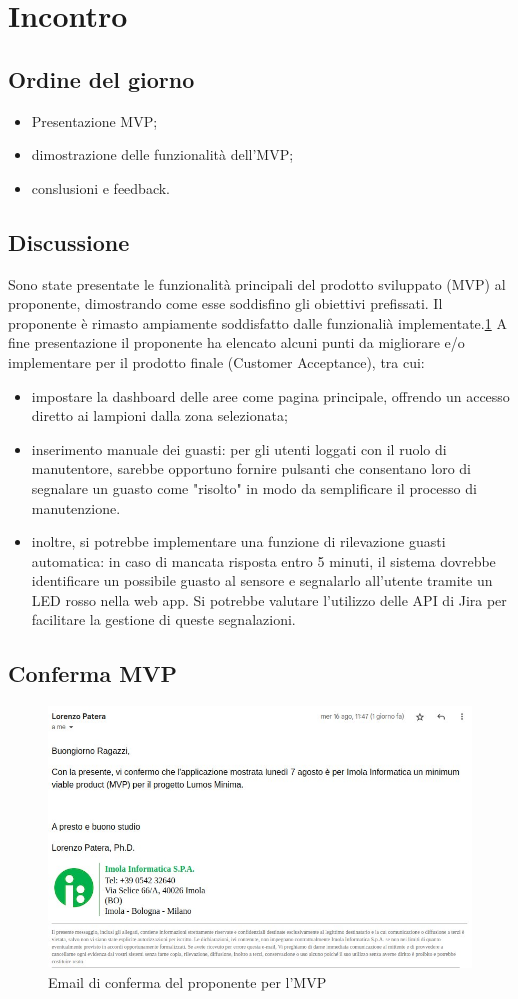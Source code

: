 \section{Incontro}

\subsection{Ordine del giorno}
\begin{itemize}
    \item Presentazione MVP;
    \item dimostrazione delle funzionalità dell'MVP;
    \item conslusioni e feedback.
\end{itemize}

\subsection{Discussione}
Sono state presentate le funzionalità principali del prodotto sviluppato (MVP) al proponente, dimostrando come esse soddisfino gli obiettivi prefissati. Il proponente è rimasto ampiamente soddisfatto dalle funzionalià implementate.\ref{fig:email-mvp}
A fine presentazione il proponente ha elencato alcuni punti da migliorare e/o implementare per il prodotto finale (Customer Acceptance), tra cui:
\begin{itemize}
    \item impostare la dashboard delle aree come pagina principale, offrendo un accesso diretto ai lampioni dalla zona selezionata;
    \item inserimento manuale dei guasti: per gli utenti loggati con il ruolo di manutentore, sarebbe opportuno fornire pulsanti che consentano loro di segnalare un guasto come "risolto" in modo da semplificare il processo di manutenzione.
    \item inoltre, si potrebbe implementare una funzione di rilevazione guasti automatica: in caso di mancata risposta entro 5 minuti, il sistema dovrebbe identificare un possibile guasto al sensore e segnalarlo all'utente tramite un LED rosso nella web app. Si potrebbe valutare l'utilizzo delle API di Jira per facilitare la gestione di queste segnalazioni.
\end{itemize}

\subsection{Conferma MVP}

\begin{figure}[H]
    \centering
    \includegraphics[width=\textwidth]{img/mvp.jpg}
    \caption{Email di conferma del proponente per l'MVP}
    \label{fig:email-mvp}
\end{figure}